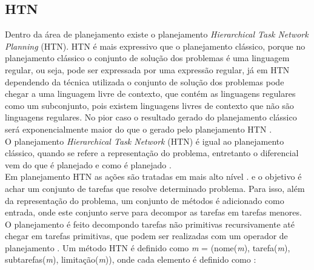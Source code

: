 

\subsection{HTN} 


Dentro da área de planejamento existe o planejamento \textit{Hierarchical Task Network Planning} (HTN). HTN é mais expressivo que o planejamento clássico, porque no planejamento clássico o conjunto de solução dos problemas é uma linguagem regular, ou seja, pode ser expressada por uma expressão regular, já em HTN dependendo da técnica utilizada o conjunto de solução dos problemas pode chegar a uma linguagem livre de contexto, que contém as linguagens regulares como um subconjunto, pois existem linguagens livres de contexto que não são linguagens regulares. No pior caso o resultado gerado do planejamento clássico será exponencialmente maior do que o gerado pelo planejamento HTN \cite{ghallab2004automated}.  \\

O planejamento \textit{Hierarchical Task Network} (HTN) é igual ao planejamento clássico, quando se refere a representação do problema, entretanto o diferencial vem do que é planejado e como é planejado \cite{ghallab2004automated}. \\

Em planejamento HTN as ações são tratadas em mais alto nível \cite{intelligence2003modern}. e o objetivo é achar um conjunto de tarefas que resolve determinado problema. Para isso, além da representação do problema, um conjunto de métodos é adicionado como entrada, onde este conjunto serve para decompor as tarefas em tarefas menores. O planejamento é feito decompondo tarefas não primitivas recursivamente até chegar em tarefas primitivas, que podem ser realizadas com um operador de planejamento \cite{ghallab2004automated}. Um método HTN é definido como \textit{m} = (nome(\textit{m}), tarefa(\textit{m}), subtarefas(\textit{m}), limitação(\textit{m})), onde cada elemento é definido como \cite{ghallab2004automated}: 
 
